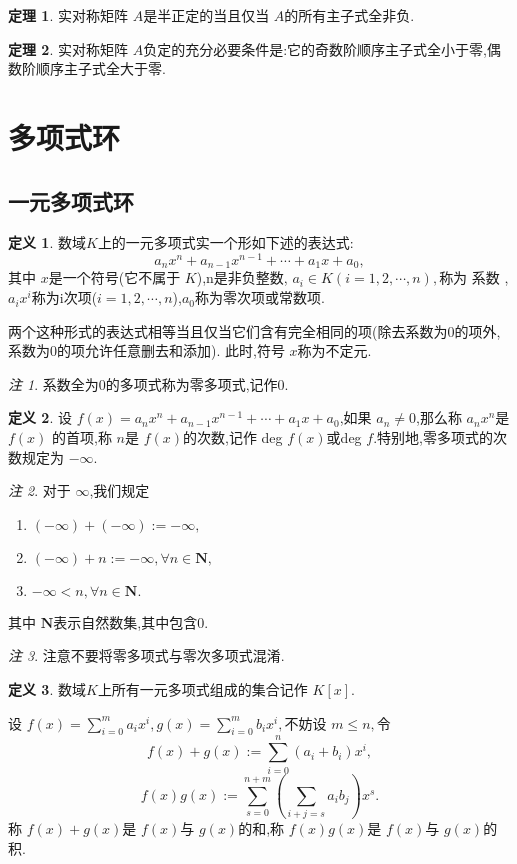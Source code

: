 \documentclass[a4paper,11pt]{article}%
\theoremstyle{remark}
\newtheorem*{remark}{注}
\theoremstyle{definition}
\newtheorem{theorem}{定理}[section]
\theoremstyle{definition}
\newtheorem*{definition}{定义}
\theoremstyle{plain}
\begin{document}
\begin{theorem}
    实对称矩阵 $A$是半正定的当且仅当 $A$的所有主子式全非负.
\end{theorem}
\begin{theorem}
    实对称矩阵 $A$负定的充分必要条件是:它的奇数阶顺序主子式全小于零,偶数阶顺序主子式全大于零.
\end{theorem}
\section{多项式环}
\subsection{一元多项式环}
\begin{definition}
    数域$K$上的一元多项式实一个形如下述的表达式:
    \[a_nx^n+a_{n-1}x^{n-1}+\cdots+a_1x+a_0,\]
    其中 $x$是一个符号(它不属于 $K$),n是非负整数, $a_i\in K(i=1,2,\cdots,n),$称为
    系数 , $a_ix^i$称为i次项($i=1,2,\cdots,n$),$a_0$称为零次项或常数项.

    两个这种形式的表达式相等当且仅当它们含有完全相同的项(除去系数为0的项外,系数为0的项允许任意删去和添加).
    此时,符号 $x$称为不定元.
\end{definition}
\begin{remark}
    系数全为0的多项式称为零多项式,记作0.
\end{remark}
\begin{definition}
    设 $f(x)=a_nx^n+a_{n-1}x^{n-1}+\cdots+a_1x+a_0$,如果 $a_n\neq 0$,那么称 $a_nx^n$是 $f(x)$
    的首项,称 $n$是 $f(x)$的次数,记作 deg $f(x)$或deg $f$.特别地,零多项式的次数规定为 $-\infty$.
\end{definition}
\begin{remark}
    对于 $\infty$,我们规定
    \begin{enumerate}
        \item $(-\infty)+(-\infty):=-\infty,$
        \item $(-\infty)+n:=-\infty,\forall n \in \mathbf{N},$
        \item $-\infty < n,\forall n \in  \mathbf{N}.$
    \end{enumerate}
    其中 $\mathbf{N}$表示自然数集,其中包含0.
\end{remark}
\begin{remark}
    注意不要将零多项式与零次多项式混淆.
\end{remark}
\begin{definition}
    数域$K$上所有一元多项式组成的集合记作 $K[x]$.

    设 $f(x)=\sum_{i=0}^{m}{a_ix^i},g(x)=\sum_{i=0}^{m}{b_ix^i},$不妨设 $m\leq n,$令
    \[f(x)+g(x):=\sum_{i=0}^{n}{(a_i+b_i)x^i},\]
    \[f(x)g(x):=\sum_{s=0}^{n+m}{(\sum_{i+j=s}{a_ib_j})x^s.}\]
    称 $f(x)+g(x)$是 $f(x)$与 $g(x)$的和,称 $f(x)g(x)$是 $f(x)$与 $g(x)$的积.
\end{definition}
\end{document}
